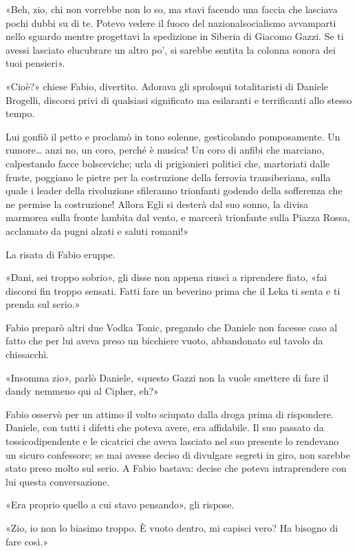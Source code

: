 «Beh, zio, chi non vorrebbe non lo so, ma stavi facendo una faccia che lasciava pochi dubbi su di te. Potevo vedere il fuoco del nazionalsocialismo avvamparti nello sguardo mentre progettavi la spedizione in Siberia di Giacomo Gazzi. Se ti avessi lasciato elucubrare un altro po', si sarebbe sentita la colonna sonora dei tuoi pensieri».

«Cioè?» chiese Fabio, divertito. Adorava gli sproloqui totalitaristi di Daniele Brogelli, discorsi privi di qualsiasi significato ma esilaranti e terrificanti allo stesso tempo.

Lui gonfiò il petto e proclamò in tono solenne, gesticolando pomposamente. Un rumore\ldots{} anzi no, un coro, perché è musica! Un coro di anfibi che marciano, calpestando facce bolsceviche; urla di prigionieri politici che, martoriati dalle fruste, poggiano le pietre per la costruzione della ferrovia transiberiana, sulla quale i leader della rivoluzione sfileranno trionfanti godendo della sofferenza che ne permise la costruzione! Allora Egli si desterà dal suo sonno, la divisa marmorea sulla fronte lambita dal vento, e marcerà trionfante sulla Piazza Rossa, acclamato da pugni alzati e saluti romani!»

La risata di Fabio eruppe.

«Dani, sei troppo sobrio», gli disse non appena riuscì a riprendere fiato, «fai discorsi fin troppo sensati. Fatti fare un beverino prima che il Leka ti senta e ti prenda sul serio.»

Fabio preparò altri due Vodka Tonic, pregando che Daniele non facesse caso al fatto che per lui aveva preso un bicchiere vuoto, abbandonato sul tavolo da chissacchì.

«Insomma zio», parlò Daniele, «questo Gazzi non la vuole smettere di fare il dandy nemmeno qui al Cipher, eh?»

Fabio osservò per un attimo il volto sciupato dalla droga prima di rispondere. Daniele, con tutti i difetti che poteva avere, era affidabile. Il suo passato da tossicodipendente e le cicatrici che aveva lasciato nel suo presente lo rendevano un sicuro confessore; se mai avesse deciso di divulgare segreti in giro, non sarebbe stato preso molto sul serio. A Fabio bastava: decise che poteva intraprendere con lui questa conversazione.

«Era proprio quello a cui stavo pensando», gli rispose.

«Zio, io non lo biasimo troppo. È vuoto dentro, mi capisci vero? Ha bisogno di fare così.»

